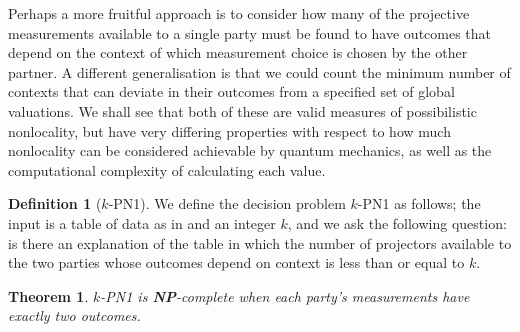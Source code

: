 \documentclass{amsart}
\newtheorem{thm}{Theorem}
\theoremstyle{definition}
\newtheorem{defn}{Definition}
\begin{document}
Perhaps a more fruitful approach is to consider how many of the projective measurements available to a single party must be found to have outcomes that depend on the context of which measurement choice is chosen by the other partner. A different generalisation is that we could count the minimum number of contexts that can deviate in their outcomes from a specified set of global valuations. We shall see that both of these are valid measures of possibilistic nonlocality, but have very differing properties with respect to how much nonlocality can be considered achievable by quantum mechanics, as well as the computational complexity of calculating each value.

\begin{defn}[$k$-\textsc{PN1}]
We define the decision problem $k$-\textsc{PN1} as follows; the input is a table of data as in \cite{Mans2011} and an integer $k$, and we ask the following question: is there an explanation of the table in which the number of projectors available to the two parties whose outcomes depend on context is less than or equal to $k$.
\end{defn}
\begin{thm}$k$-\textsc{PN1} is \textbf{NP}-complete when each party's measurements have exactly two outcomes.
\end{thm}
\end{document}
